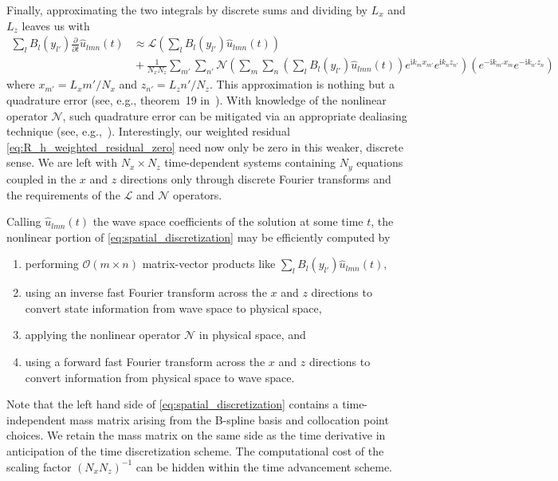 \documentclass[letterpaper,11pt,nointlimits,reqno,draft]{amsart}
\newcommand{\ii}{\ensuremath{\mathrm{i}}}
\begin{document}
Finally, approximating the two integrals by discrete sums and dividing
by $L_x$ and $L_z$ leaves us with
\begin{align}
  \sum_{l} B_l\!\left(y_{l'}\right)
  \frac{\partial}{\partial{}t} \hat{u}_{l m n}(t)
  &\approx
  \mathscr{L}\left(
    \sum_{l}
     B_l\!\left(y_{l'}\right)
    \hat{u}_{l m n}(t)
  \right)
\\
  &{}+
  \frac{1}{N_x N_z}
  \sum_{m'} \sum_{n'}
  \mathscr{N}\left(
    \sum_{m}
    \sum_{n}
    \left(
      \sum_{l} B_l\!\left(y_{l'}\right)
      \hat{u}_{l m n}(t)
    \right)
    e^{\ii k_m x_{m'}}e^{\ii k_n z_{n'}}
  \right)
  \!\!
  \left(
    e^{-\ii k_{m'} x_m}e^{-\ii k_{n'} z_n}
  \right)
  \label{eq:spatial_discretization}
\end{align}
where $x_{m'}=L_x m' / N_x$ and $z_{n'}=L_z n' / N_z$.  This approximation is
nothing but a quadrature error (see, e.g., theorem~19 in~\cite{Boyd2001}).
With knowledge of the nonlinear operator $\mathscr{N}$, such quadrature error
can be mitigated via an appropriate dealiasing technique (see,
e.g.,~\cite{Canuto2006}).  Interestingly, our weighted residual
\eqref{eq:R_h_weighted_residual_zero} need now only be zero in this weaker,
discrete sense.  We are left with $N_x\times{}N_z$ time-dependent systems
containing $N_y$ equations coupled in the $x$ and $z$ directions only through
discrete Fourier transforms and the requirements of the $\mathscr{L}$ and
$\mathscr{N}$ operators.

Calling $\hat{u}_{l m n}(t)$ the wave space coefficients of the solution at
some time $t$, the nonlinear portion of \eqref{eq:spatial_discretization} may
be efficiently computed by
\begin{enumerate}
 \item performing $\mathcal{O}\!\left(m\times{}n\right)$ matrix-vector products
       like $\sum_{l} B_l\!\left(y_{l'}\right) \hat{u}_{l m n}(t)$,
 \item using an inverse fast Fourier transform across
       the $x$ and $z$ directions to convert state information from wave space
       to physical space,
 \item applying the nonlinear operator $\mathscr{N}$ in physical space, and
 \item using a forward fast Fourier transform across the $x$ and $z$
       directions to convert information from physical space to wave space.
\end{enumerate}
Note that the left hand side of \eqref{eq:spatial_discretization} contains a
time-independent mass matrix arising from the B-spline basis and collocation
point choices.  We retain the mass matrix on the same side as the time
derivative in anticipation of the time discretization scheme.  The
computational cost of the scaling factor $\left(N_x N_z\right)^{-1}$
can be hidden within the time advancement scheme.
\end{document}
